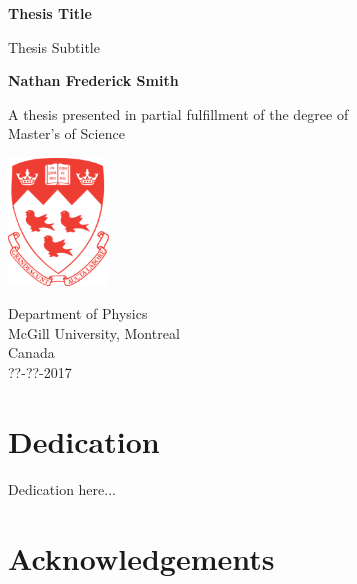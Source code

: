 \documentclass[12pt, letterpaper]{report}
\begin{document}

\begin{titlepage}
    \begin{center}
        \vspace*{1cm}
        
        \Huge
        \textbf{
            Thesis Title
        }
        
        \vspace{0.5cm}
        \LARGE
        Thesis Subtitle
        
        \vspace{1.5cm}
        \Large 
        \textbf{Nathan Frederick Smith}
        
        \vfill

        \Large
        A thesis presented in partial fulfillment of the degree of\\
        Master's of Science
        
        \vspace{0.8cm}
        
        \includegraphics[width=0.2\textwidth]{crest.eps}
        
        \Large
        Department of Physics\\
        McGill University, Montreal\\
        Canada\\
        ??-??-2017
        
    \end{center}
\end{titlepage}

\doublespacing

\section*{Dedication}
\label{sec:dedication}

Dedication here...

\clearpage

\section*{Acknowledgements}
\label{sec:acknowledgements}
\end{document}
